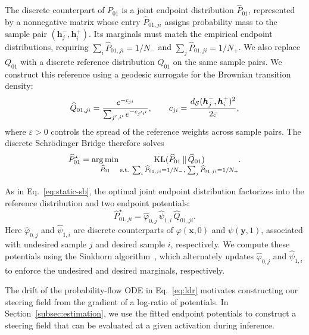 The discrete counterpart of $P_{01}$ is a joint endpoint distribution $\widehat{P}_{01}$, represented by a nonnegative matrix whose entry $\widehat{P}_{01,ji}$ assigns probability mass to the sample pair $(\boldsymbol{h}_j^-,\boldsymbol{h}_i^+)$. Its marginals must match the empirical endpoint distributions, requiring $\sum_i\widehat{P}_{01,ji}=1/N_-$ and $\sum_j\widehat{P}_{01,ji}=1/N_+$. We also replace $Q_{01}$ with a discrete reference
distribution $\widehat{Q}_{01}$ on the same sample pairs.
We construct this reference using a geodesic surrogate
for the Brownian transition density:
\begin{equation}
\displaystyle
\widehat{Q}_{01,ji}
=
\frac{e^{-c_{ji}}}{\sum_{j',i'}e^{-c_{j'i'}}},
\qquad
c_{ji}
=
\frac{d_{\mathcal{S}}(\boldsymbol{h}_j^-,\boldsymbol{h}_i^+)^2}
{2\varepsilon},
\label{eq:discrete-reference}
\end{equation}
where $\varepsilon>0$ controls the spread of the reference
weights across sample pairs. The discrete
Schr\"{o}dinger Bridge therefore solves
\begin{equation}
\displaystyle
\widehat{P}_{01}^{\star}
=
\operatorname*{arg\,min}_{\widehat{P}_{01}}
\underset{
\text{s.t.}\;
\sum_i\widehat{P}_{01,ji}=1/N_-,
\;\sum_j\widehat{P}_{01,ji}=1/N_+
}{
\mathrm{KL}(\widehat{P}_{01}\,\Vert\,\widehat{Q}_{01})
}.
\label{eq:discrete-sb}
\end{equation}

As in Eq.~\eqref{eq:static-sb}, the optimal joint endpoint
distribution factorizes into the reference distribution
and two endpoint potentials:
\begin{equation}
\displaystyle
\widehat{P}_{01,ji}^{\star}
=
\widehat{\varphi}_{0,j}\,
\widehat{\psi}_{1,i}\,
\widehat{Q}_{01,ji}.
\label{eq:discrete-factors}
\end{equation}
Here $\widehat{\varphi}_{0,j}$ and $\widehat{\psi}_{1,i}$
are discrete counterparts of
$\varphi(\boldsymbol{x},0)$ and $\psi(\boldsymbol{y},1)$,
associated with undesired sample $j$ and desired sample $i$,
respectively. We compute these potentials using the
Sinkhorn algorithm~\citep{cuturi2013sinkhorn}, which
alternately updates $\widehat{\varphi}_{0,j}$  and $\widehat{\psi}_{1,i}$ to enforce
the undesired and desired marginals, respectively.

The drift of the probability-flow ODE in Eq.~\eqref{eq:ldr} motivates constructing our steering field from the gradient of a log-ratio of potentials. In Section~\ref{subsec:estimation}, we use the fitted endpoint potentials to construct a steering field that can be evaluated at a given activation during inference.


